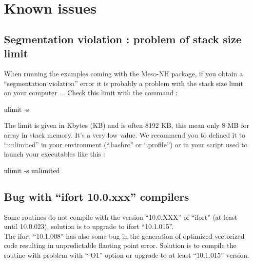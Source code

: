 \section{Known issues}
\label{sec:known_issues}

\subsection{Segmentation violation : problem of stack size limit}

When running the examples coming with the Meso-NH package, if you obtain a ``segmentation violation'' error it is probably a problem with the stack size limit on your computer ... Check this limit with the command :
\begin{bashcode}
 ulimit -s
\end{bashcode}

The limit is given in Kbytes (KB) and is often 8192 KB, this mean only 8 MB for array in stack memory. It's a very low value. We recommend you to defined it to ``unlimited'' in your environment (``.bashrc'' or ``.profile'') or in your script used to launch your executables like this :
\begin{bashcode}
ulimit -s unlimited
\end{bashcode}

\subsection{Bug with ``ifort 10.0.xxx'' compilers}

Some routines do not compile with the version ``10.0.XXX'' of ``ifort'' (at least until 10.0.023), solution is to upgrade to ifort ``10.1.015''. \\

The ifort ``10.1.008'' has also some bug in the generation of optimized vectorized code resulting in unpredictable flaoting point error. Solution is to compile the routine with problem with ``-O1'' option or upgrade to at least ``10.1.015'' version.